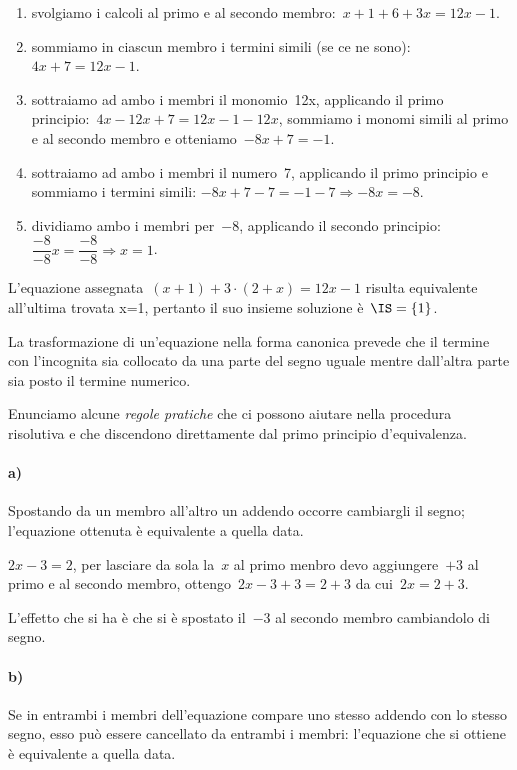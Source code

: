\begin{exrig}
\begin{esempio}
\begin{enumerate}
 \item svolgiamo i calcoli al primo e al secondo
membro:~\(x+1+6+3x=12x-1\).
 \item sommiamo in ciascun membro i termini
simili (se ce ne sono):~\(4x+7=12x-1\).
 \item sottraiamo ad ambo i membri il monomio~12x, 
 applicando il primo principio:~\(4x-12x+7=12x-1-12x\), sommiamo i
monomi simili al primo e al secondo membro e otteniamo~\(-8x+7=-1\).
 \item sottraiamo ad ambo i membri il numero~7,
applicando il primo principio e sommiamo i termini simili:
\(-8x+7-7=-1-7\Rightarrow -8x=-8\).
 \item dividiamo ambo i membri per~\(-8\),
applicando il secondo principio:
\(\dfrac{-8}{-8}x=\dfrac{-8}{-8}\Rightarrow x=1\).
\end{enumerate}

L'equazione assegnata~\((x+1)+3\cdot (2+x)=12x-1\)
risulta equivalente all'ultima trovata x=1, pertanto il
suo insieme soluzione è~\(\IS = \{1\}\).
 \end{esempio}
\end{exrig}


\osservazione
La trasformazione di un'equazione nella forma canonica
prevede che il termine con l'incognita sia collocato da
una parte del segno uguale mentre dall'altra parte sia
posto il termine numerico.

Enunciamo alcune \emph{regole pratiche} che ci possono aiutare nella
procedura risolutiva e che discendono direttamente dal primo principio
d'equivalenza.

\paragraph{a)} Spostando da un membro all'altro un addendo occorre
cambiargli il segno; l'equazione ottenuta è
equivalente a quella data.

\(2x-3=2\), per lasciare da sola la~\(x\) al primo menbro devo aggiungere~\(+3\) al 
primo e
al secondo membro, ottengo~\(2x-3+3=2+3\) da cui~\(2x=2+3\).

L'effetto che si ha è che si è spostato il~\(-3\) al
secondo membro cambiandolo di segno.

\paragraph{b)} Se in entrambi i membri dell'equazione compare uno
stesso addendo con lo stesso segno, esso può essere cancellato da
entrambi i membri: l'equazione che si ottiene è
equivalente a quella data.

